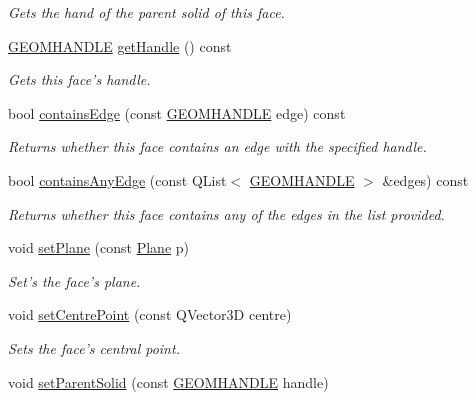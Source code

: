 \begin{DoxyCompactItemize}
\begin{DoxyCompactList}\small\item\em Gets the hand of the parent solid of this face. \end{DoxyCompactList}\item 
\hyperlink{vertex_8h_a72202e57358ed73cd212e9a2eaf39aeb}{G\-E\-O\-M\-H\-A\-N\-D\-L\-E} \hyperlink{class_face3_d_ad0bc376833756ff964ad8967fc459c8f}{get\-Handle} () const 
\begin{DoxyCompactList}\small\item\em Gets this face's handle. \end{DoxyCompactList}\item 
bool \hyperlink{class_face3_d_a7b6289ce08b7e07e050641449d42a4d7}{contains\-Edge} (const \hyperlink{vertex_8h_a72202e57358ed73cd212e9a2eaf39aeb}{G\-E\-O\-M\-H\-A\-N\-D\-L\-E} edge) const 
\begin{DoxyCompactList}\small\item\em Returns whether this face contains an edge with the specified handle. \end{DoxyCompactList}\item 
bool \hyperlink{class_face3_d_ae8daf489ffc7b411edb78b2e62e95e80}{contains\-Any\-Edge} (const Q\-List$<$ \hyperlink{vertex_8h_a72202e57358ed73cd212e9a2eaf39aeb}{G\-E\-O\-M\-H\-A\-N\-D\-L\-E} $>$ \&edges) const 
\begin{DoxyCompactList}\small\item\em Returns whether this face contains any of the edges in the list provided. \end{DoxyCompactList}\item 
void \hyperlink{class_face3_d_ab58095c8043c2f08751327a6399365c9}{set\-Plane} (const \hyperlink{class_plane}{Plane} p)
\begin{DoxyCompactList}\small\item\em Set's the face's plane. \end{DoxyCompactList}\item 
void \hyperlink{class_face3_d_aedb4458bdb3b06dddd830c53726aa844}{set\-Centre\-Point} (const Q\-Vector3\-D centre)
\begin{DoxyCompactList}\small\item\em Sets the face's central point. \end{DoxyCompactList}\item 
void \hyperlink{class_face3_d_aaf0b823d7e83800962181136a3806be5}{set\-Parent\-Solid} (const \hyperlink{vertex_8h_a72202e57358ed73cd212e9a2eaf39aeb}{G\-E\-O\-M\-H\-A\-N\-D\-L\-E} handle)

\end{DoxyCompactItemize}

